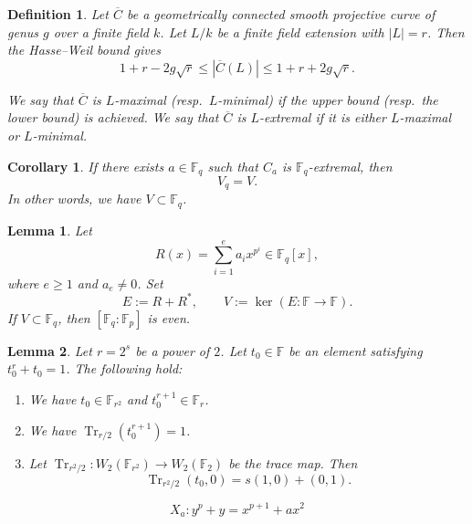 \documentclass[10pt,a4paper]{amsart}
\newtheorem{lemma}{Lemma}
\newtheorem{definition}{Definition}
\newtheorem{corollary}{Corollary}
\def\F{{\mathbb F}}
\DeclareMathOperator{\Tr}{Tr}
\begin{document}
\begin{definition}\label{mmx}
Let $\overline{C}$ be a geometrically connected smooth projective curve of genus $g$ over a finite field $k$. Let $L/k$ be  a finite field extension with $|L|=r$. Then  the Hasse--Weil bound gives 
\[1+r-2g\sqrt{r}\leq|\overline{C}(L)|\leq 1+r+2g\sqrt{r}.\]


We say that $\overline{C}$ is  \emph{$L$-maximal} (resp.\ \emph{$L$-minimal}) if the upper bound (resp.\ the lower bound) is achieved. We say that $\overline{C}$ is \emph{$L$-extremal} if it is either $L$-maximal or $L$-minimal. \end{definition}

\begin{corollary}\label{exN}
 If there exists $a\in \F_q$ such that $C_a$ is $\F_q$-extremal, then 
 \[
 V_q=V. 
 \]
  In other words, we have $V\subset \F_q$. 
\end{corollary}

 \begin{lemma}\label{even}
 Let 
 \[R(x)=\sum_{i=1}^e a_i x^{p^i} \in 
 \F_q[x],\] 
 where $e\geq1$ and $a_e\neq0$. Set 
 \[
 E:=R+R^\ast,\qquad V:=\ker(E\colon \F\to \F).\]
 If $V\subset \F_q$, then $[\F_q:\F_p]$ is even. 
 \end{lemma}

\begin{lemma}\label{Trt_0}
Let $r=2^s$ be a power of $2$. 
Let $t_0\in\F$ be an element satisfying $t_0^{r}+t_0=1$. The following hold: 
\begin{enumerate}
\item We have $t_0\in\F_{r^2}$ and $t_0^{r+1}\in \F_{r}$. 
\item We have $\Tr_{r/2}(t_0^{r+1})=1$. 
\item Let $\Tr_{r^2/2}\colon W_2(\F_{r^2})\to W_2(\F_2)$ be the trace map. Then 
\[\Tr_{r^2/2}(t_0,0)=s(1,0)+(0,1). \]
\end{enumerate}
\end{lemma}

\begin{equation}\label{xpax}
X_a\colon y^p+y=x^{p+1}+ax^2
\end{equation} 
\end{document}
